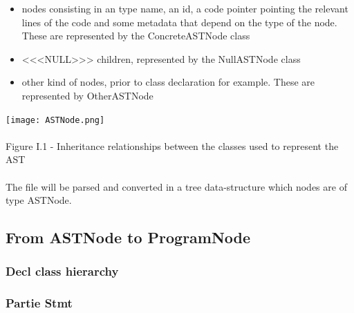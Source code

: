 \documentclass{report}
\begin{document}
\vspace{4mm}
\begin{itemize}
\item nodes consisting in an type name, an id, a code pointer pointing the relevant lines of the code and some
metadata that depend on the type of the node. These are represented by the ConcreteASTNode class\vspace{1mm}
\item <<<NULL>>> children, represented by the NullASTNode class\vspace{1mm}
\item other kind of nodes, prior to class declaration for example. These are represented by OtherASTNode\vspace{1mm}
\end{itemize}

\begin{center}
\texttt{[image: ASTNode.png]}
~\\~\\Figure I.1 - Inheritance relationships between the classes used to represent the AST
\end{center}

\paragraph{}
\hspace{4mm}\textnormal{The file will be parsed and converted in a tree data-structure which nodes are of type ASTNode.}

\subsection{From ASTNode to ProgramNode}

\subsubsection{\textbf{Decl} class hierarchy}

\subsubsection{Partie \textbf{Stmt}}

\paragraph{}
\hspace{4mm}\textnormal{}
\end{document}
